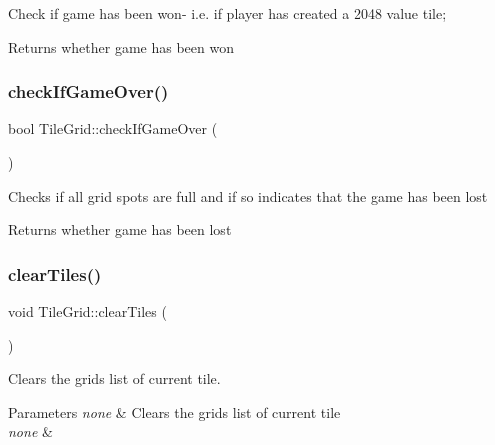 Check if game has been won-\/ i.\+e. if player has created a 2048 value tile;

\begin{DoxyReturn}{Returns}
whether game has been won 
\end{DoxyReturn}
\mbox{\label{classTileGrid_aab03be042d185457b04d9468952df68f}} 
\subsubsection{\texorpdfstring{check\+If\+Game\+Over()}{checkIfGameOver()}}
{\footnotesize\ttfamily bool Tile\+Grid\+::check\+If\+Game\+Over (\begin{DoxyParamCaption}{ }\end{DoxyParamCaption})}

Checks if all grid spots are full and if so indicates that the game has been lost

\begin{DoxyReturn}{Returns}
whether game has been lost 
\end{DoxyReturn}
\mbox{\label{classTileGrid_a96339e9ad2afee46b58ec68ceb8f417c}} 
\subsubsection{\texorpdfstring{clear\+Tiles()}{clearTiles()}}
{\footnotesize\ttfamily void Tile\+Grid\+::clear\+Tiles (\begin{DoxyParamCaption}{ }\end{DoxyParamCaption})}

Clears the grid\textquotesingle{}s list of current tile.


\begin{DoxyParams}{Parameters}
{\em none} & Clears the grid\textquotesingle{}s list of current tile\\
\hline
{\em none} & \\
\hline
\end{DoxyParams}
\mbox{\label{classTileGrid_a2edc90ec1238786d746f8db1219ca056}} 
